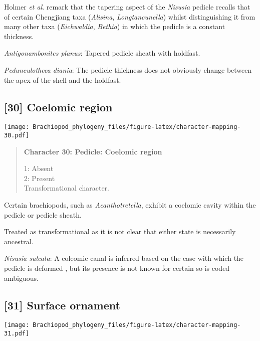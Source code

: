 \documentclass[openany]{book}
\theoremstyle{definition}
\theoremstyle{definition}
\theoremstyle{definition}
\theoremstyle{remark}
\begin{document}
Holmer \emph{et al}. \citeyearpar{Holmer2018Theattachment} remark that
the tapering aspect of the \emph{Nisusia} pedicle recalls that of
certain Chengjiang taxa (\emph{Alisina}, \emph{Longtancunella}) whilst
distinguishing it from many other taxa (\emph{Eichwaldia},
\emph{Bethia}) in which the pedicle is a constant thickness.

\hypertarget{Antigonambonites_planus-coding-29}{}
\emph{Antigonambonites planus}: Tapered pedicle sheath with holdfast.

\hypertarget{Pedunculotheca_diania-coding-29}{}
\emph{Pedunculotheca diania}: The pedicle thickness does not obviously
change between the apex of the shell and the holdfast.

\subsection*{{[}30{]} Coelomic region}\label{coelomic-region}

\texttt{[image: Brachiopod\_phylogeny\_files/figure-latex/character-mapping-30.pdf]}

\begin{quote}
\textbf{Character 30: Pedicle: Coelomic region}

1: Absent\\
2: Present\\
Transformational character.
\end{quote}

Certain brachiopods, such as \emph{Acanthotretella}, exhibit a coelomic
cavity within the pedicle or pedicle sheath.

Treated as transformational as it is not clear that either state is
necessarily ancestral.

\hypertarget{Nisusia_sulcata-coding-30}{}
\emph{Nisusia sulcata}: A coleomic canal is inferred based on the ease
with which the pedicle is deformed
\citep{Holmer2018Evolutionarysignificance}, but its presence is not
known for certain so is coded ambiguous.

\subsection*{{[}31{]} Surface ornament}\label{surface-ornament-1}

\texttt{[image: Brachiopod\_phylogeny\_files/figure-latex/character-mapping-31.pdf]}
\end{document}
